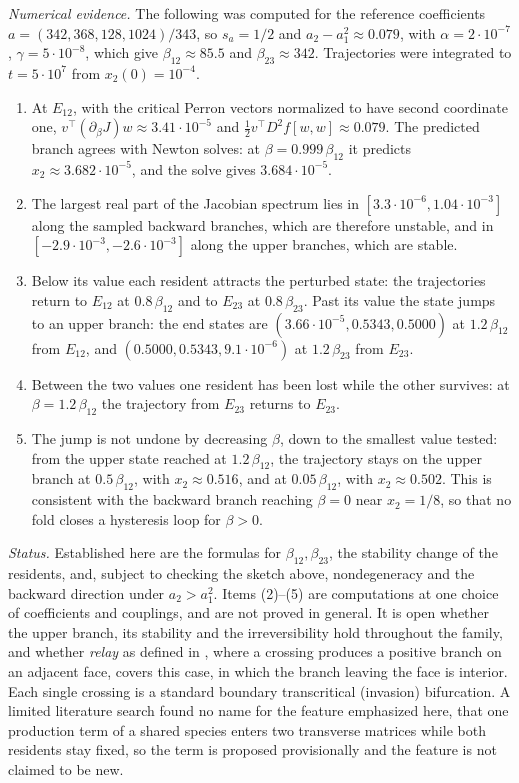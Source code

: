 \emph{Numerical evidence.} The following was computed for the reference coefficients $a=(342,368,128,1024)/343$, so
$s_a=1/2$ and $a_2-a_1^2\approx0.079$, with $\alpha=2\cdot10^{-7}$, $\gamma=5\cdot10^{-8}$, which give $\beta_{12}\approx85.5$ and
$\beta_{23}\approx342$. Trajectories were integrated to $t=5\cdot10^7$ from $x_2(0)=10^{-4}$.
\begin{enumerate}
\item At $E_{12}$, with the critical Perron vectors normalized to have second coordinate one,
$v^\top(\partial_\beta J)w\approx3.41\cdot10^{-5}$ and $\frac12v^\top D^2f[w,w]\approx0.079$. The predicted branch agrees with Newton
solves: at $\beta=0.999\,\beta_{12}$ it predicts $x_2\approx3.682\cdot10^{-5}$, and the solve gives $3.684\cdot10^{-5}$.
\item The largest real part of the Jacobian spectrum lies in $[3.3\cdot10^{-6},1.04\cdot10^{-3}]$ along the sampled backward branches,
which are therefore unstable, and in $[-2.9\cdot10^{-3},-2.6\cdot10^{-3}]$ along the upper branches, which are stable.
\item Below its value each resident attracts the perturbed state: the trajectories return to $E_{12}$ at $0.8\,\beta_{12}$ and to $E_{23}$
at $0.8\,\beta_{23}$. Past its value the state jumps to an upper branch: the end states are $(3.66\cdot10^{-5},0.5343,0.5000)$ at
$1.2\,\beta_{12}$ from $E_{12}$, and $(0.5000,0.5343,9.1\cdot10^{-6})$ at $1.2\,\beta_{23}$ from $E_{23}$.
\item Between the two values one resident has been lost while the other survives: at $\beta=1.2\,\beta_{12}$ the trajectory from $E_{23}$ returns to
$E_{23}$.
\item The jump is not undone by decreasing $\beta$, down to the smallest value tested: from the upper state reached at
$1.2\,\beta_{12}$, the trajectory stays on the upper branch at $0.5\,\beta_{12}$, with $x_2\approx0.516$, and at $0.05\,\beta_{12}$, with $x_2\approx0.502$.
This is consistent with the backward branch reaching $\beta=0$ near $x_2=1/8$, so that no fold closes a hysteresis loop for $\beta>0$.
\end{enumerate}

\emph{Status.} Established here are the formulas for $\beta_{12},\beta_{23}$, the stability change of the residents, and,
subject to checking the sketch above, nondegeneracy and the backward direction under $a_2>a_1^2$. Items (2)--(5) are computations at one choice of
coefficients and couplings, and are not proved in general. It is open whether the upper branch, its stability and the irreversibility hold
throughout the family, and whether \emph{relay} as defined in \cite{AAHrel}, where a crossing produces a positive branch on an adjacent
face, covers this case, in which the branch leaving the face is interior. Each single crossing is a standard boundary transcritical (invasion)
bifurcation. A limited literature search found no name for the feature emphasized here, that one production term of a shared
species enters two transverse matrices while both residents stay fixed, so the term is proposed provisionally and the feature is not claimed to be new.

